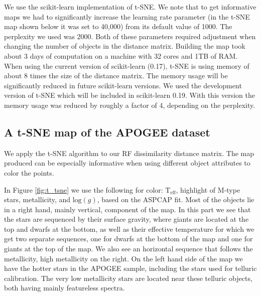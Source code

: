 \documentclass[fleqn,usenatbib]{mnras}
\begin{document}
We use the scikit-learn \citep[][]{pedregosa11} implementation of t-SNE. We note that to get informative maps we had to significantly increase the learning rate parameter (in the t-SNE map shown below it was set to 40,000) from its default value of 1000. The perplexity we used was 2000. Both of these parameters required adjustment when changing the number of objects in the distance matrix. Building the map took about 3 days of computation on a machine with 32 cores and 1TB of RAM. When using the current version of scikit-learn (0.17), t-SNE is using memory of about 8 times the size of the distance matrix. The memory usage will be significantly reduced in future scikit-learn versions. We used the development version of t-SNE which will be included in scikit-learn 0.19. With this version the memory usage was reduced by roughly a factor of 4, depending on the perplexity. 



\subsection{A t-SNE map of the APOGEE dataset}
We apply the t-SNE algorithm to our RF dissimilarity distance matrix. The map produced can be especially informative when using different object attributes to color the points. 

In Figure \ref{fig:t_tsne} we use the following for color:
$\mathrm{T}_{\mathrm{eff}}$, highlight of M-type stars, metallicity, and $\mathrm{log} \left(g\right)$, based on the ASPCAP fit. Most of the objects lie in a right hand, mainly vertical, component of the map. In this part we see that the stars are sequenced by their surface gravity, where giants are located at the top and dwarfs at the bottom, as well as their effective temperature for which we get two separate sequences, one for dwarfs at the bottom of the map and  one for giants at the top of the map. We also see an horizontal sequence that follows the metallicity, high metallicity on the right. On the left hand side of the map we have the hotter stars in the APOGEE sample, including the stars used for telluric calibration. The very low metallicity stars are located near these telluric objects, both having mainly featureless spectra. 
\end{document}
